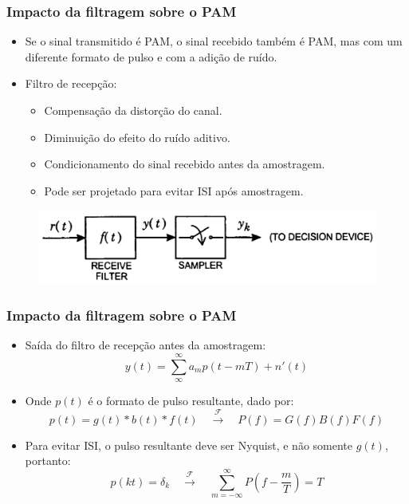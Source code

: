 \begin{frame}
	\frametitle{Impacto da filtragem sobre o PAM}

	\begin{itemize}
	    \item Se o sinal transmitido é PAM, o sinal recebido também é PAM, mas com um diferente formato de pulso e com a adição de ruído.
	    \item Filtro de recepção:
	    \begin{itemize}
		\item Compensação da distorção do canal.
		\item Diminuição do efeito do ruído aditivo.
		\item Condicionamento do sinal recebido antes da amostragem.
		\item Pode ser projetado para evitar ISI após amostragem.
	    \end{itemize}
	\end{itemize}		
	\begin{figure}[t]	
	  \begin{center}
	    \includegraphics[width=0.6\columnwidth]{figs/pam_09}
	  \end{center}
	\end{figure}
\end{frame}

\begin{frame}
	\frametitle{Impacto da filtragem sobre o PAM}

	\begin{itemize}
	    \item Saída do filtro de recepção antes da amostragem:
	    \begin{equation*}
		y(t) = \sum\limits_{\infty}^{\infty} a_m p(t-mT) + n'(t)
	    \end{equation*}
	    \item Onde $p(t)$ é o formato de pulso resultante, dado por:
	    \begin{equation*}
		p(t) = g(t) * b(t) * f(t) \quad \xrightarrow{\mathcal{F}} \quad P(f) = G(f)B(f)F(f)
	    \end{equation*}
	    \item Para evitar ISI, o pulso resultante deve ser Nyquist, e não somente $g(t)$, portanto:
	    \begin{equation*}
		    p(kt) = \delta_k \quad \xrightarrow{\mathcal{F}} \quad \sum\limits_{m=-\infty}^{\infty} P\left(f-\frac{m}{T} \right) = T
	    \end{equation*}
	\end{itemize}		
\end{frame}

